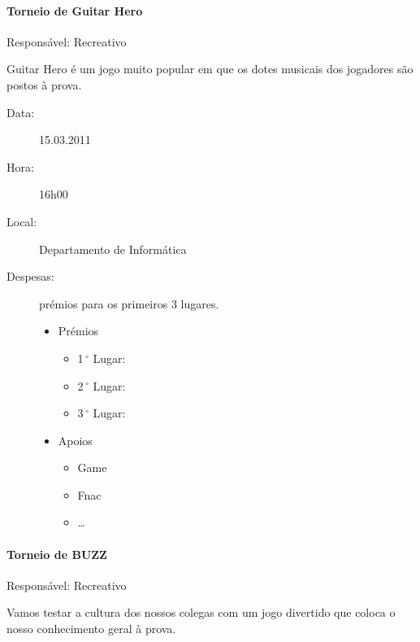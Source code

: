 \paragraph{Torneio de Guitar Hero}
Responsável: Recreativo

Guitar Hero é um jogo muito popular em que os dotes musicais dos jogadores são postos à prova.

\begin{description}
	\item[Data:] 15.03.2011
	\item[Hora:] 16h00
	\item[Local:] Departamento de Informática
	\item[Despesas:] prémios para os primeiros 3 lugares.
	\begin{itemize}
		\item Prémios
		\begin{itemize}
			\item 1$\,^{\circ}$ Lugar:
			\item 2$\,^{\circ}$ Lugar:
			\item 3$\,^{\circ}$ Lugar:
		\end{itemize}
		\item Apoios
		\begin{itemize}
			\item Game
			\item Fnac
			\item \dots  
		\end{itemize}
	\end{itemize}
\end{description}


\paragraph{Torneio de BUZZ}
Responsável: Recreativo

Vamos testar a cultura dos nossos colegas com um jogo divertido que coloca o nosso conhecimento geral à prova.

